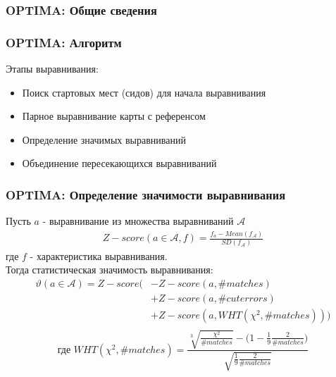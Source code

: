 \begin{frame}
\frametitle{OPTIMA: Общие сведения}


\end{frame}

\begin{frame}
\frametitle{OPTIMA: Алгоритм}

Этапы выравнивания:
\begin{itemize}
  \item Поиск стартовых мест (сидов) для начала выравнивания
  \item Парное выравнивание карты с референсом
  \item Определение значимых выравниваний
  \item Объединение пересекающихся выравниваний
\end{itemize}

\end{frame}


\begin{frame}
\frametitle{OPTIMA: Определение значимости выравнивания}
Пусть $a$ - выравнивание из множества выравниваний $\mathcal{A}$
\begin{gather*}
Z-score(a \in \mathcal{A}, f) = \frac{f_{a} - Mean(f_{\mathcal{A}})}{SD(f_{\mathcal{A}})}
\end{gather*}
где $f$ - характеристика выравнивания.\\
 Тогда статистическая значимость выравнивания:
\begin{align*}
  \vartheta (a \in \mathcal{A}) = Z-score( & -Z-score(a, \#matches) \\
  & + Z-score(a, \#cuterrors) \\
  & + Z-score(a, WHT(\chi^2, \#matches))) \\
\end{align*}
\[\text{где } WHT(\chi^2, \#matches) = \frac{\sqrt[3]{\frac{\chi^2}{\#matches}} - \big(1 - \frac{1}{9} \frac{2}{\#matches}\big)}{\sqrt{\frac{1}{9} \frac{2}{\#matches}}}\]
\end{frame}
